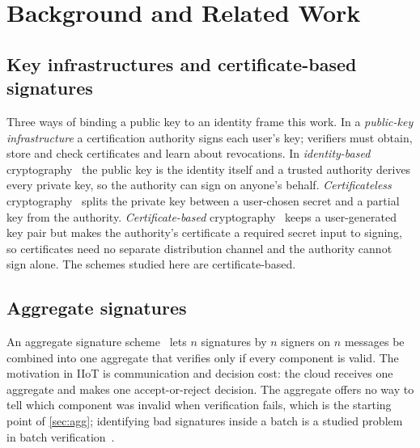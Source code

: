 \section{Background and Related Work}\label{sec:background}

\subsection{Key infrastructures and certificate-based signatures}
Three ways of binding a public key to an identity frame this work. In a \emph{public-key infrastructure}
a certification authority signs each user's key; verifiers must obtain, store and check certificates and
learn about revocations. In \emph{identity-based} cryptography~\cite{shamir1984} the public key is the
identity itself and a trusted authority derives every private key, so the authority can sign on anyone's
behalf. \emph{Certificateless} cryptography~\cite{alriyami2003} splits the private key between a
user-chosen secret and a partial key from the authority. \emph{Certificate-based}
cryptography~\cite{gentry2003} keeps a user-generated key pair but makes the authority's certificate a
required secret input to signing, so certificates need no separate distribution channel and the
authority cannot sign alone. The schemes studied here are certificate-based.

\subsection{Aggregate signatures}
An aggregate signature scheme~\cite{boneh2003} lets $n$ signatures by $n$ signers on $n$ messages be
combined into one aggregate that verifies only if every component is valid. The motivation in IIoT is
communication and decision cost: the cloud receives one aggregate and makes one accept-or-reject
decision. The aggregate offers no way to tell which component was invalid when verification fails, which
is the starting point of \cref{sec:agg}; identifying bad signatures inside a batch is a studied problem in
batch verification~\cite{pastuszak2000}.

